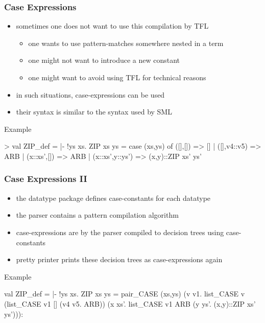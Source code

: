 \begin{frame}[fragile]
\frametitle{Case Expressions}

\begin{itemize}
\item sometimes one does not want to use this compilation by TFL
\begin{itemize}
\item one wants to use pattern-matches somewhere nested in a term
\item one might not want to introduce a new constant
\item one might want to avoid using TFL for technical reasons
\end{itemize}
\item in such situations, case-expressions can be used
\item their syntax is similar to the syntax used by SML
\end{itemize}

\begin{exampleblock}{Example}
\begin{semiverbatim}\scriptsize
> 
val ZIP_def = |- !ys xs. ZIP xs ys =
     case (xs,ys) of
       ([],[]) => []
     | ([],v4::v5) => ARB
     | (x::xs',[]) => ARB
     | (x::xs',y::ys') => (x,y)::ZIP xs' ys'
\end{semiverbatim}
\end{exampleblock}

\end{frame}



\begin{frame}[fragile]
\frametitle{Case Expressions II}

\begin{itemize}
\item the datatype package defines case-constants for each datatype
\item the parser contains a pattern compilation algorithm
\item case-expressions are by the parser compiled to decision trees using case-constants
\item pretty printer prints these decision trees as case-expressions again 
\end{itemize}

\begin{exampleblock}{Example}
\begin{semiverbatim}\scriptsize
val ZIP_def = |- !ys xs. ZIP xs ys =
     pair_CASE (xs,ys)
       (\textbsl{}v v1.
          list_CASE v (list_CASE v1 [] (\textbsl{}v4 v5. ARB))
            (\textbsl{}x xs'. list_CASE v1 ARB (\textbsl{}y ys'. (x,y)::ZIP xs' ys'))):
\end{semiverbatim}
\end{exampleblock}

\end{frame}

